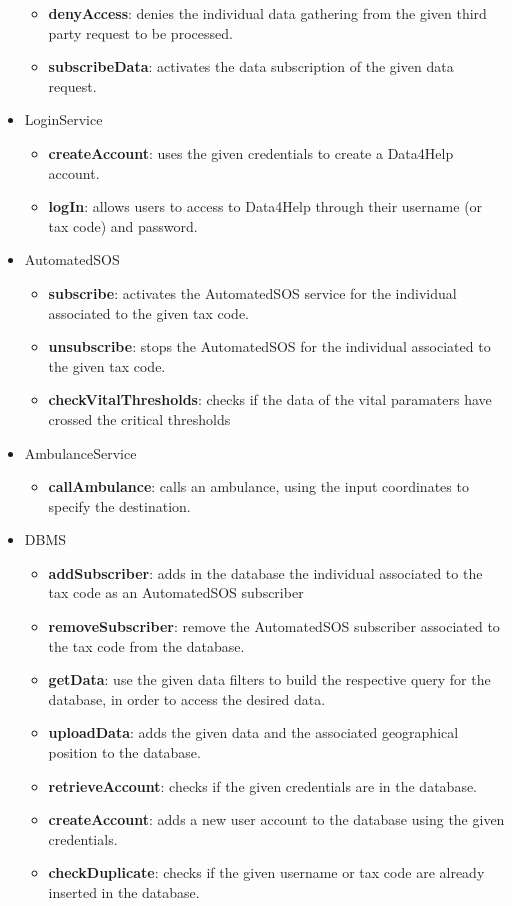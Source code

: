 \begin{itemize}
\begin{itemize}
\item \textbf{denyAccess}: denies the individual data gathering from the given third party request to be processed.
\item \textbf{subscribeData}: activates the data subscription of the given data request.
\end{itemize}
\item LoginService
\begin{itemize}
\item \textbf{createAccount}: uses the given credentials to create a Data4Help account.
\item \textbf{logIn}: allows users to access to Data4Help through their username (or tax code) and password.
\end{itemize}
\item AutomatedSOS
\begin{itemize}
\item \textbf{subscribe}: activates the AutomatedSOS service for the individual associated to the given tax code.
\item \textbf{unsubscribe}: stops the AutomatedSOS for the individual associated to the given tax code.
\item \textbf{checkVitalThresholds}: checks if the data of the vital paramaters have crossed the critical thresholds
\end{itemize}
\item AmbulanceService
\begin{itemize}
\item \textbf{callAmbulance}: calls an ambulance, using the input coordinates to specify the destination.
\end{itemize}
\item DBMS
\begin{itemize}
\item \textbf{addSubscriber}: adds in the database the individual associated to the tax code as an AutomatedSOS subscriber
\item \textbf{removeSubscriber}: remove the AutomatedSOS subscriber associated to the tax code from the database.
\item \textbf{getData}: use the given data filters to build the respective query for the database, in order to access the desired data.
\item \textbf{uploadData}: adds the given data and the associated geographical position to the database.
\item \textbf{retrieveAccount}: checks if the given credentials are in the database.
\item \textbf{createAccount}: adds a new user account to the database using the given credentials.
\item \textbf{checkDuplicate}: checks if the given username or tax code are already inserted in the database.
\end{itemize}
\end{itemize}



